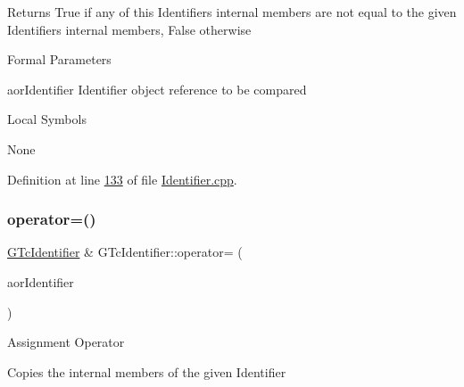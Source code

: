 \begin{DoxyReturn}{Returns}
True if any of this Identifier\textquotesingle{}s internal members are not equal to the given Identifier\textquotesingle{}s internal members, False otherwise
\end{DoxyReturn}
\begin{DoxyParagraph}{Formal Parameters}

\begin{DoxyPre}{\ttfamily [ in ]  aorIdentifier    Identifier object reference to be compared }\end{DoxyPre}

\end{DoxyParagraph}
\begin{DoxyParagraph}{Local Symbols}

\begin{DoxyPre}{\ttfamily  None }\end{DoxyPre}
 
\end{DoxyParagraph}


Definition at line \mbox{\hyperlink{_identifier_8cpp_source_l00133}{133}} of file \mbox{\hyperlink{_identifier_8cpp_source}{Identifier.\+cpp}}.

\mbox{\label{class_g_n_common_1_1_g_n_notification_1_1_g_tc_identifier_af1b94ca6c81713c79e8a0b62e541db21}} 
\subsubsection{\texorpdfstring{operator=()}{operator=()}}
{\footnotesize\ttfamily \mbox{\hyperlink{class_g_n_common_1_1_g_n_notification_1_1_g_tc_identifier}{G\+Tc\+Identifier}} \& G\+Tc\+Identifier\+::operator= (\begin{DoxyParamCaption}\item[{const \mbox{\hyperlink{class_g_n_common_1_1_g_n_notification_1_1_g_tc_identifier}{G\+Tc\+Identifier}} \&}]{aor\+Identifier }\end{DoxyParamCaption})}

Assignment Operator

Copies the internal members of the given Identifier

